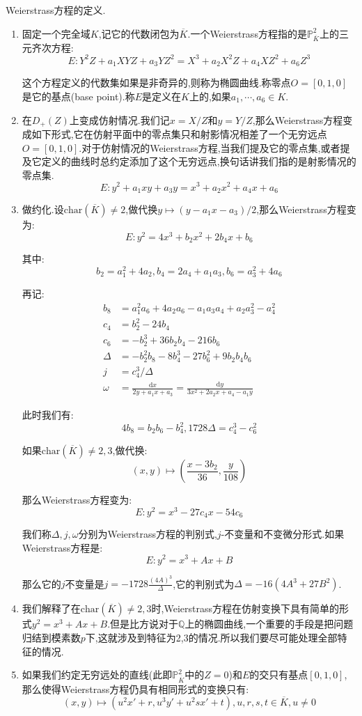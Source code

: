 Weierstrass方程的定义.
\begin{enumerate}
	\item 固定一个完全域$K$,记它的代数闭包为$\overline{K}$.一个Weierstrass方程指的是$\mathbb{P}_{\overline{K}}^2$上的三元齐次方程:
	$$E:Y^2Z+a_1XYZ+a_3YZ^2=X^3+a_2X^2Z+a_4XZ^2+a_6Z^3$$
	
	这个方程定义的代数集如果是非奇异的,则称为椭圆曲线.称零点$O=[0,1,0]$是它的基点(base point).称$E$是定义在$K$上的,如果$a_1,\cdots,a_6\in K$.
	\item 在$D_+(Z)$上变成仿射情况.我们记$x=X/Z$和$y=Y/Z$,那么Weierstrass方程变成如下形式,它在仿射平面中的零点集只和射影情况相差了一个无穷远点$O=[0,1,0]$.对于仿射情况的Weierstrass方程,当我们提及它的零点集,或者提及它定义的曲线时总约定添加了这个无穷远点,换句话讲我们指的是射影情况的零点集.
	$$E:y^2+a_1xy+a_3y=x^3+a_2x^2+a_4x+a_6$$
	\item 做约化.设$\mathrm{char}(\overline{K})\not=2$,做代换$y\mapsto(y-a_1x-a_3)/2$,那么Weierstrass方程变为:
	$$E:y^2=4x^3+b_2x^2+2b_4x+b_6$$
	
	其中:
	$$b_2=a_1^2+4a_2,b_4=2a_4+a_1a_3,b_6=a_3^2+4a_6$$
	
	再记:
	\begin{align*}
		b_8&=a_1^2a_6+4a_2a_6-a_1a_3a_4+a_2a_3^2-a_4^2\\
		c_4&=b_2^2-24b_4\\
		c_6&=-b_2^3+36b_2b_4-216b_6\\
		\Delta&=-b_2^2b_8-8b_4^3-27b_6^2+9b_2b_4b_6\\
		j&=c_4^3/\Delta\\
		\omega&=\frac{\mathrm{d}x}{2y+a_1x+a_3}=\frac{\mathrm{d}y}{3x^2+2a_2x+a_4-a_1y}
	\end{align*}
	
	此时我们有:
	$$4b_8=b_2b_6-b_4^2,1728\Delta=c_4^3-c_6^2$$
	
	如果$\mathrm{char}(\overline{K})\not=2,3$,做代换:
	$$(x,y)\mapsto\left(\frac{x-3b_2}{36},\frac{y}{108}\right)$$
	
	那么Weierstrass方程变为:
	$$E:y^2=x^3-27c_4x-54c_6$$
	
	我们称$\Delta,j,\omega$分别为Weierstrass方程的判别式,$j$-不变量和不变微分形式.如果Weierstrass方程是:
	$$E:y^2=x^3+Ax+B$$
	
	那么它的$j$不变量是$j=-1728\frac{(4A)^3}{\Delta}$,它的判别式为$\Delta=-16(4A^3+27B^2)$.
	\item 我们解释了在$\mathrm{char}(\overline{K})\not=2,3$时,Weierstrass方程在仿射变换下具有简单的形式$y^2=x^3+Ax+B$.但是比方说对于$\mathbb{Q}$上的椭圆曲线,一个重要的手段是把问题归结到模素数$p$下,这就涉及到特征为2,3的情况.所以我们要尽可能处理全部特征的情况.
	\item 如果我们约定无穷远处的直线(此即$\mathbb{P}_{\overline{K}}^2$中的$Z=0$)和$E$的交只有基点$[0,1,0]$,那么使得Weierstrass方程仍具有相同形式的变换只有:
	$$(x,y)\mapsto(u^2x'+r,u^3y'+u^2sx'+t),u,r,s,t\in\overline{K},u\not=0$$
	

\end{enumerate}
